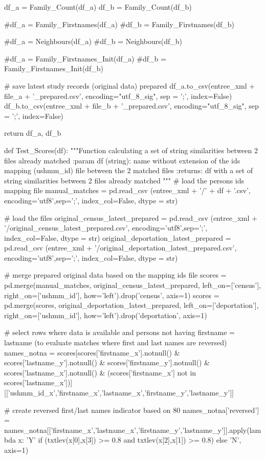 \documentclass[a4paper,12pt,twoside]{book}
\begin{document}
\begin{python}
  df_a = Family_Count(df_a)
  df_b = Family_Count(df_b)

  #df_a = Family_Firstnames(df_a)
  #df_b = Family_Firstnames(df_b)

  #df_a = Neighbours(df_a)
  #df_b = Neighbours(df_b)

  #df_a = Family_Firstnames_Init(df_a)
  #df_b = Family_Firstnames_Init(df_b)

  


  # save latest study records (original data) prepared
  df_a.to_csv(entree_xml + file_a + '_prepared.csv', encoding="utf_8_sig", sep = ';', index=False)
  df_b.to_csv(entree_xml + file_b + '_prepared.csv', encoding="utf_8_sig", sep = ';', index=False)
  
  
  return df_a, df_b

def Test_Scores(df):
  """Function calculating a set of string similarities between 2 files already matched
    :param df (string): name without extension of the ids mapping (ushmm_id) file between the 2 matched files
    :returns: df with a set of string similarities between 2 files already matched
  """
  # load the persons ids mapping file
  manual_matches = pd.read_csv (entree_xml + '/' + df + '.csv', encoding='utf8',sep=';', index_col=False, dtype = str)
  
  # load the files
  original_census_latest_prepared = pd.read_csv (entree_xml + '/original_census_latest_prepared.csv', encoding='utf8',sep=';', index_col=False, dtype = str)
  original_deportation_latest_prepared = pd.read_csv (entree_xml + '/original_deportation_latest_prepared.csv', encoding='utf8',sep=';', index_col=False, dtype = str)

  # merge prepared original data based on the mapping ids file
  scores = pd.merge(manual_matches, original_census_latest_prepared, left_on=['census'], right_on=['ushmm_id'], how='left').drop('census', axis=1)
  scores = pd.merge(scores, original_deportation_latest_prepared, left_on=['deportation'], right_on=['ushmm_id'], how='left').drop('deportation', axis=1)

  # select rows where data is available and persons not having firstname = lastname (to evaluate matches where first and last names are reversed)
  names_notna = scores[scores['firstname_x'].notnull() & scores['lastname_y'].notnull() & scores['firstname_y'].notnull() & scores['lastname_x'].notnull() & (scores['firstname_x'] not in scores['lastname_x'])][['ushmm_id_x','firstname_x','lastname_x','firstname_y','lastname_y']]
  
  # create reversed first/last names indicator based on 80%
  names_notna['reversed'] =  names_notna[['firstname_x','lastname_x','firstname_y','lastname_y']].apply(lambda x: 'Y' if (txtlev(x[0],x[3]) >= 0.8 and txtlev(x[2],x[1]) >= 0.8) else 'N', axis=1)


\end{python}
\end{document}
